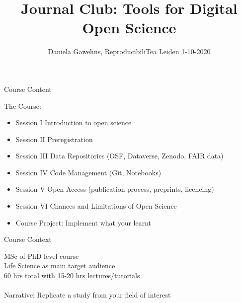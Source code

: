 \documentclass [t,11pt] {beamer}
\title{Journal Club: Tools for Digital Open Science}
\author {Daniela Gawehns, ReproducibiliTea Leiden 1-10-2020}
\date{}
\begin{document}
\maketitle





\begin {frame} { Course Content }

The Course: 
\begin {itemize}
\item Session I  Introduction to open science
\item Session II Preregistration
\item Session III Data Repositories (OSF, Dataverse, Zenodo, FAIR data)
\item Session IV Code Management (Git, Notebooks)
\item Session V Open Access (publication process, preprints, licencing)
\item Session VI Chances and Limitations of Open Science
\item Course Project: Implement what your learnt
\end {itemize}


\end {frame}



\begin {frame} {Course Context}

MSc of PhD level course \\
Life Science as main target audience \\
60 hrs total with 15-20 hrs lectures/tutorials \\
\\
Narrative: Replicate a study from your field of interest

\end {frame}
\end{document}

